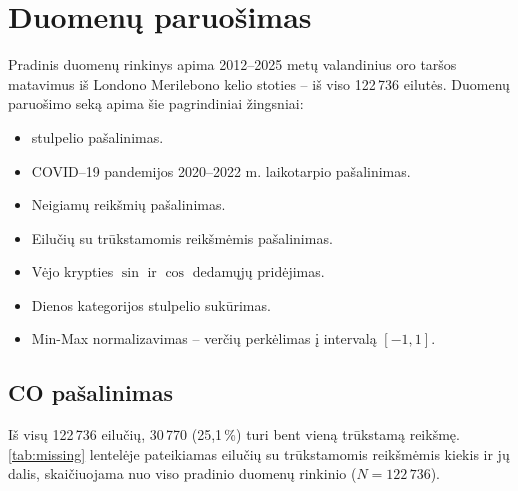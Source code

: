 \documentclass[]{VUMIFTemplateClass}
\begin{document}

    \onehalfspacing
    

    \singlespacing

    \tableofcontents
    \onehalfspacing


    \section{Duomenų paruošimas}
    Pradinis duomenų rinkinys apima 2012--2025 metų valandinius oro taršos matavimus iš Londono Merilebono kelio stoties -- iš viso 122\,736 eilutės.
    Duomenų paruošimo seką apima šie pagrindiniai žingsniai:
    \begin{itemize}
        \item {} stulpelio pašalinimas.
        \item COVID--19 pandemijos 2020--2022 m. laikotarpio pašalinimas.
        \item Neigiamų reikšmių pašalinimas.
        \item Eilučių su trūkstamomis reikšmėmis pašalinimas.
        \item Vėjo krypties $\sin$ ir $\cos$ dedamųjų pridėjimas.
        \item Dienos kategorijos stulpelio sukūrimas.
        \item Min-Max normalizavimas -- verčių perkėlimas į intervalą $[-1, 1]$.
    \end{itemize}

    \subsection{CO pašalinimas}
    Iš visų 122\,736 eilučių, 30\,770 (25,1\,\%) turi bent vieną trūkstamą reikšmę.
    \ref{tab:missing} lentelėje pateikiamas eilučių su trūkstamomis reikšmėmis kiekis ir jų dalis, skaičiuojama nuo viso pradinio duomenų rinkinio ($N=122\,736$).
\end{document}
